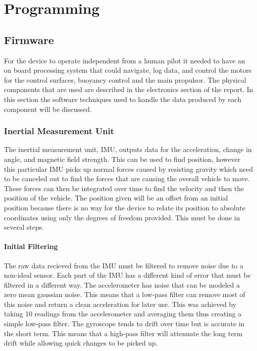 \documentclass{report}
\begin{document}
\section{Programming}
\subsection{Firmware}
For the device to operate independent from a human pilot it needed to have an on board processing system that could navigate, log data, and control the motors for the control surfaces, buoyancy control and the main propulsor. The physical components that are used are described in the electronics section of the report. In this section the software techniques used to handle the data produced by each component will be discussed.
\subsubsection{Inertial Measurement Unit}
The inertial measurement unit, IMU, outputs data for the acceleration, change in angle, and magnetic field strength. This can be used to find position, however this particular IMU picks up normal forces caused by resisting gravity which need to be  canceled out to find the forces that are causing the overall vehicle to move. These forces can then be integrated over time to find the velocity and then the position of the vehicle. The position given will be an offset from an initial position because there is no way for the device to relate its position to absolute coordinates using only the degrees of freedom provided. This must be done in several steps.
\paragraph{Initial Filtering} The raw data recieved from the IMU must be filtered to remove noise due to a non-ideal sensor. Each part of the IMU has a different kind of error that must be filtered in a different way. The accelerometer has noise that can be modeled a zero mean gaussian noise. This means that a low-pass filter can remove most of this noise and return a clean acceleration for later use. This was achieved by taking 10 readings from the accelerometer and averaging them thus creating a simple low-pass filter. The gyroscope tends to drift over time but is accurate in the short term. This means that a high-pass filter will attenuate the long term drift while allowing quick changes to be picked up.
\end{document}
